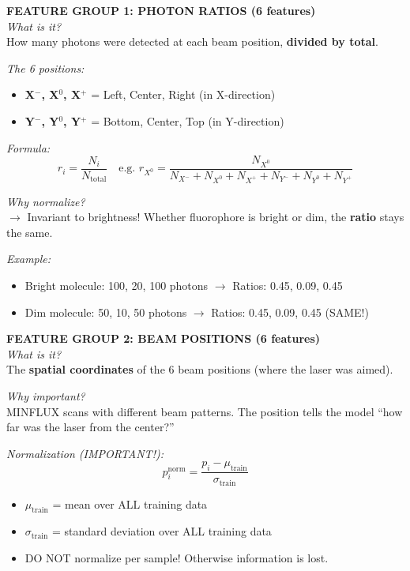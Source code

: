 \documentclass[a4paper,10pt]{article}
\begin{document}
\begin{mdframed}[style=konzept]
\textbf{FEATURE GROUP 1: PHOTON RATIOS (6 features)}\\[5pt]
\textit{What is it?}\\
How many photons were detected at each beam position, \textbf{divided by total}.

\textit{The 6 positions:}
\begin{itemize}[leftmargin=*, nosep]
    \item \textbf{X$^-$, X$^0$, X$^+$} = Left, Center, Right (in X-direction)
    \item \textbf{Y$^-$, Y$^0$, Y$^+$} = Bottom, Center, Top (in Y-direction)
\end{itemize}

\textit{Formula:}
$$r_i = \frac{N_i}{N_{\text{total}}} \quad \text{e.g. } r_{X^0} = \frac{N_{X^0}}{N_{X^-} + N_{X^0} + N_{X^+} + N_{Y^-} + N_{Y^0} + N_{Y^+}}$$

\textit{Why normalize?}\\
$\rightarrow$ Invariant to brightness! Whether fluorophore is bright or dim, the \textbf{ratio} stays the same.

\textit{Example:}
\begin{itemize}[leftmargin=*, nosep]
    \item Bright molecule: 100, 20, 100 photons $\rightarrow$ Ratios: 0.45, 0.09, 0.45
    \item Dim molecule: 50, 10, 50 photons $\rightarrow$ Ratios: 0.45, 0.09, 0.45 (SAME!)
\end{itemize}
\end{mdframed}

\vspace{0.3cm}

\begin{mdframed}[style=konzept]
\textbf{FEATURE GROUP 2: BEAM POSITIONS (6 features)}\\[5pt]
\textit{What is it?}\\
The \textbf{spatial coordinates} of the 6 beam positions (where the laser was aimed).

\textit{Why important?}\\
MINFLUX scans with different beam patterns. The position tells the model ``how far was the laser from the center?''

\textit{Normalization (IMPORTANT!):}
$$p_i^{\text{norm}} = \frac{p_i - \mu_{\text{train}}}{\sigma_{\text{train}}}$$

\begin{itemize}[leftmargin=*, nosep]
    \item $\mu_{\text{train}}$ = mean over ALL training data
    \item $\sigma_{\text{train}}$ = standard deviation over ALL training data
    \item DO NOT normalize per sample! Otherwise information is lost.
\end{itemize}
\end{mdframed}
\end{document}
